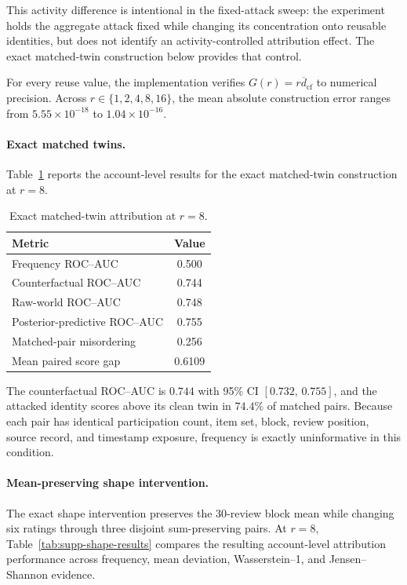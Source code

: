 This activity difference is intentional in the fixed-attack sweep: the
experiment holds the aggregate attack fixed while changing its concentration
onto reusable identities, but does not identify an activity-controlled
attribution effect. The exact matched-twin construction below provides that
control.

For every reuse value, the implementation verifies
$G(r)=r\overline d_{\mathrm{cf}}$ to numerical precision. Across
$r\in\{1,2,4,8,16\}$, the mean absolute construction error ranges from
$5.55\times10^{-18}$ to $1.04\times10^{-16}$.


\paragraph{Exact matched twins.}
Table~\ref{tab:supp-twin-results} reports the account-level results for the
exact matched-twin construction at $r=8$.

\begin{table}[t]
\caption{Exact matched-twin attribution at $r=8$.}
\label{tab:supp-twin-results}
\centering
\small
\begin{tabular}{@{}lc@{}}
\toprule
Metric & Value \\
\midrule
Frequency ROC--AUC & 0.500 \\
Counterfactual ROC--AUC & 0.744 \\
Raw-world ROC--AUC & 0.748 \\
Posterior-predictive ROC--AUC & 0.755 \\
Matched-pair misordering & 0.256 \\
Mean paired score gap & 0.6109 \\
\bottomrule
\end{tabular}
\end{table}

The counterfactual ROC--AUC is $0.744$ with 95\% CI
$[0.732,\,0.755]$, and the attacked identity scores above its clean twin in
$74.4\%$ of matched pairs. Because each pair has identical participation
count, item set, block, review position, source record, and timestamp exposure,
frequency is exactly uninformative in this condition.


\paragraph{Mean-preserving shape intervention.}
The exact shape intervention preserves the 30-review block mean while changing
six ratings through three disjoint sum-preserving pairs. At $r=8$, Table~\ref{tab:supp-shape-results} compares the resulting
account-level attribution performance across frequency, mean deviation,
Wasserstein--1, and Jensen--Shannon evidence.

